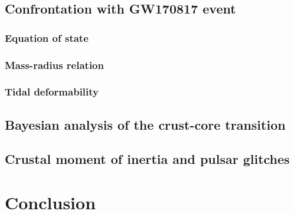 
\subsection{Confrontation with GW170817 event} %


\subsubsection{Equation of state} %

\subsubsection{Mass-radius relation} %


\subsubsection{Tidal deformability} %


\subsection{Bayesian analysis of the crust-core transition} %


\subsection{Crustal moment of inertia and pulsar
glitches}\label{subsec:gli_stats} %


\section{Conclusion} %

